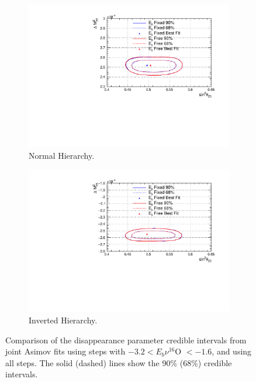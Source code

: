 \begin{figure}[!htbp]
\centering
\begin{subfigure}{.7\textwidth}
  \centering
  \includegraphics[width=0.95\linewidth]{figs/compMaCh3Contours_EB_asimov/compMaCh3Contours_EB_disapp_asimovA_NH}
  \caption{Normal Hierarchy.}
  \label{fig:EBDisNH}
\end{subfigure}
\begin{subfigure}{.7\textwidth}
  \centering
  \includegraphics[width=0.95\linewidth]{figs/compMaCh3Contours_EB_asimov/compMaCh3Contours_EB_disapp_asimovA_IH}
  \caption{Inverted Hierarchy.}
  \label{fig:EBDisIH}
\end{subfigure}
\caption{Comparison of the disappearance parameter credible intervals from joint Asimov fits using steps with $ -3.2 < E_b \nu ^{16}$O $< -1.6$, and using all steps. The solid (dashed) lines show the 90$\%$ ($68\%$) credible intervals.}
\label{fig:EBDis}
\end{figure}

